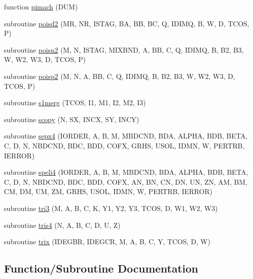 \begin{DoxyCompactItemize}
\item 
function \hyperlink{poisson_8f_a0eba8f880947ac3a6a76d9f0b5006fa5}{pimach} (D\+U\+M)
\item 
subroutine \hyperlink{poisson_8f_a0764fedadc183c9ff523c436a98a570c}{poisd2} (M\+R, N\+R, I\+S\+T\+A\+G, B\+A, B\+B, B\+C, Q, I\+D\+I\+M\+Q, B, W, D, T\+C\+O\+S, P)
\item 
subroutine \hyperlink{poisson_8f_a1a3286c2c2ed3988f551533a53fd6940}{poisn2} (M, N, I\+S\+T\+A\+G, M\+I\+X\+B\+N\+D, A, B\+B, C, Q, I\+D\+I\+M\+Q, B, B2, B3, W, W2, W3, D, T\+C\+O\+S, P)
\item 
subroutine \hyperlink{poisson_8f_aaa1fe08ecf01ed90ae4a2c1cf5be95ce}{poisp2} (M, N, A, B\+B, C, Q, I\+D\+I\+M\+Q, B, B2, B3, W, W2, W3, D, T\+C\+O\+S, P)
\item 
subroutine \hyperlink{poisson_8f_ad5fdef356b1982072c3e7c0c95b21372}{s1merg} (T\+C\+O\+S, I1, M1, I2, M2, I3)
\item 
subroutine \hyperlink{poisson_8f_a24785e467bd921df5a2b7300da57c469}{scopy} (N, S\+X, I\+N\+C\+X, S\+Y, I\+N\+C\+Y)
\item 
subroutine \hyperlink{poisson_8f_a3bae4b2dbb12aa9ef1982c25a75b4dad}{sepx4} (I\+O\+R\+D\+E\+R, A, B, M, M\+B\+D\+C\+N\+D, B\+D\+A, A\+L\+P\+H\+A, B\+D\+B, B\+E\+T\+A, C, D, N, N\+B\+D\+C\+N\+D, B\+D\+C, B\+D\+D, C\+O\+F\+X, G\+R\+H\+S, U\+S\+O\+L, I\+D\+M\+N, W, P\+E\+R\+T\+R\+B, I\+E\+R\+R\+O\+R)
\item 
subroutine \hyperlink{poisson_8f_a5dc2044995a8b7eba5b7d6e919f893e1}{speli4} (I\+O\+R\+D\+E\+R, A, B, M, M\+B\+D\+C\+N\+D, B\+D\+A, A\+L\+P\+H\+A, B\+D\+B, B\+E\+T\+A, C, D, N, N\+B\+D\+C\+N\+D, B\+D\+C, B\+D\+D, C\+O\+F\+X, A\+N, B\+N, C\+N, D\+N, U\+N, Z\+N, A\+M, B\+M, C\+M, D\+M, U\+M, Z\+M, G\+R\+H\+S, U\+S\+O\+L, I\+D\+M\+N, W, P\+E\+R\+T\+R\+B, I\+E\+R\+R\+O\+R)
\item 
subroutine \hyperlink{poisson_8f_a3734e68dfa3022162c3f94650a43d8d9}{tri3} (M, A, B, C, K, Y1, Y2, Y3, T\+C\+O\+S, D, W1, W2, W3)
\item 
subroutine \hyperlink{poisson_8f_acc6b03c725e2ea27649e45764c502fb2}{tris4} (N, A, B, C, D, U, Z)
\item 
subroutine \hyperlink{poisson_8f_a7822bc5b65c017cec3010a9f33cb316f}{trix} (I\+D\+E\+G\+B\+R, I\+D\+E\+G\+C\+R, M, A, B, C, Y, T\+C\+O\+S, D, W)
\end{DoxyCompactItemize}


\subsection{Function/\+Subroutine Documentation}
\hypertarget{poisson_8f_a82f42c45b2e6677f11e94429b26e1663}{}
